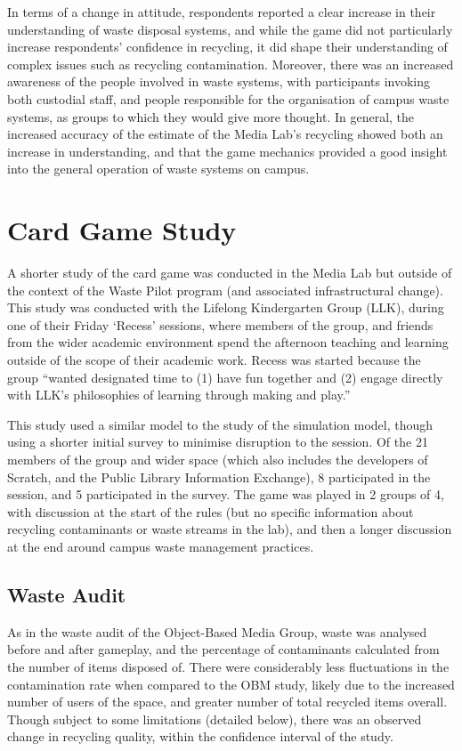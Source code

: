 \documentclass[nofonts,nols,justified,nobib]{tufte-book}
\begin{document}
In terms of a change in attitude, respondents reported a clear increase in their understanding of waste disposal systems, and while the game did not particularly increase respondents' confidence in recycling, it did shape their understanding of complex issues such as recycling contamination. Moreover, there was an increased awareness of the people involved in waste systems, with participants invoking both custodial staff, and people responsible for the organisation of campus waste systems, as groups to which they would give more thought. In general, the increased accuracy of the estimate of the Media Lab's recycling showed both an increase in understanding, and that the game mechanics provided a good insight into the general operation of waste systems on campus.


\section*{Card Game Study}
A shorter study of the card game was conducted in the Media Lab but outside of the context of the Waste Pilot program (and associated infrastructural change). This study was conducted with the Lifelong Kindergarten Group (LLK), during one of their Friday `Recess' sessions, where members of the group, and friends from the wider academic environment spend the afternoon teaching and learning outside of the scope of their academic work. Recess was started because the group ``wanted designated time to (1) have fun together and (2) engage directly with LLK's philosophies of learning through making and play.'' \cite{otts_e-mail_2019}

This study used a similar model to the study of the simulation model, though using a shorter initial survey to minimise disruption to the session. Of the 21 members of the group and wider space (which also includes the developers of Scratch, and the Public Library Information Exchange), 8 participated in the session, and 5 participated in the survey. The game was played in 2 groups of 4, with discussion at the start of the rules (but no specific information about recycling contaminants or waste streams in the lab), and then a longer discussion at the end around campus waste management practices.

\subsection*{Waste Audit}
As in the waste audit of the Object-Based Media Group, waste was analysed before and after gameplay, and the percentage of contaminants calculated from the number of items disposed of. There were considerably less fluctuations in the contamination rate when compared to the OBM study, likely due to the increased number of users of the space, and greater number of total recycled items overall. Though subject to some limitations (detailed below), there was an observed change in recycling quality, within the confidence interval of the study.
\end{document}
